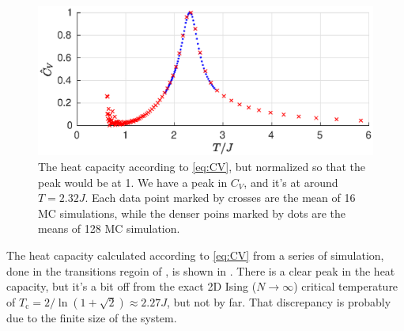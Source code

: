 \documentclass[11pt,letter, swedish, english
]{article}
\newcommand{\Tc}{\ensuremath{T_{\text{c}}}}
\begin{document}
\begin{figure}
\centering
\includegraphics[width=1\textwidth]{CV_L-16_all.eps}
\caption{The heat capacity according to \eqref{eq:CV}, but normalized
  so that the peak would be at 1. We have a peak in $C_V$, and it's at
  around $T=2.32J$. 
  Each data point marked by crosses are the mean of 16 MC simulations,
  while the denser poins marked by dots are the means of 128 MC
  simulation. } 
\label{fig:CV1}
\end{figure}


The heat capacity calculated according to \eqref{eq:CV} from a
series of simulation, done in the transitions regoin of
, is shown in . There is a clear peak
in the heat capacity, but it's a bit off from the exact 2D Ising
($N\to\infty$) critical temperature of 
$\Tc = 2/\ln(1+\sqrt2) \approx 2.27J$, but not by far. That
discrepancy is probably due to the finite size of the system.
\end{document}

